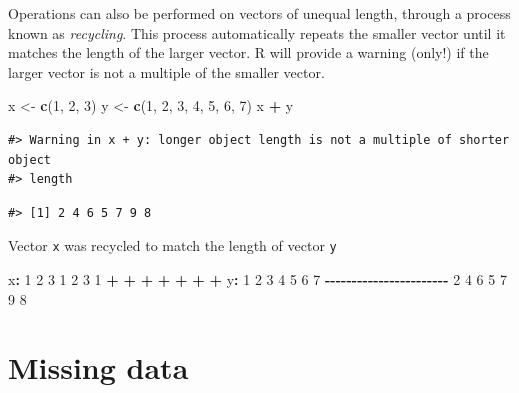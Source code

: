 \documentclass[
]{book}
\newenvironment{Shaded}{\begin{snugshade}}{\end{snugshade}}
\newcommand{\DecValTok}[1]{\textcolor[rgb]{0.00,0.00,0.81}{#1}}
\newcommand{\FunctionTok}[1]{\textcolor[rgb]{0.13,0.29,0.53}{\textbf{#1}}}
\newcommand{\NormalTok}[1]{#1}
\newcommand{\OtherTok}[1]{\textcolor[rgb]{0.56,0.35,0.01}{#1}}
\newcommand{\SpecialCharTok}[1]{\textcolor[rgb]{0.81,0.36,0.00}{\textbf{#1}}}
\begin{document}
Operations can also be performed on vectors of unequal length, through
a process known as \emph{recycling}. This process automatically repeats the smaller vector
until it matches the length of the larger vector. R will provide a warning
(only!) if the larger vector is not a multiple of the smaller vector.

\begin{Shaded}
\begin{Highlighting}[]
\NormalTok{x }\OtherTok{\textless{}{-}} \FunctionTok{c}\NormalTok{(}\DecValTok{1}\NormalTok{, }\DecValTok{2}\NormalTok{, }\DecValTok{3}\NormalTok{)}
\NormalTok{y }\OtherTok{\textless{}{-}} \FunctionTok{c}\NormalTok{(}\DecValTok{1}\NormalTok{, }\DecValTok{2}\NormalTok{, }\DecValTok{3}\NormalTok{, }\DecValTok{4}\NormalTok{, }\DecValTok{5}\NormalTok{, }\DecValTok{6}\NormalTok{, }\DecValTok{7}\NormalTok{)}
\NormalTok{x }\SpecialCharTok{+}\NormalTok{ y}
\end{Highlighting}
\end{Shaded}

\begin{verbatim}
#> Warning in x + y: longer object length is not a multiple of shorter object
#> length
\end{verbatim}

\begin{verbatim}
#> [1] 2 4 6 5 7 9 8
\end{verbatim}

Vector \texttt{x} was recycled to match the length of vector \texttt{y}

\begin{Shaded}
\begin{Highlighting}[]
\NormalTok{x}\SpecialCharTok{:}  \DecValTok{1}  \DecValTok{2}  \DecValTok{3}  \DecValTok{1}  \DecValTok{2}  \DecValTok{3}  \DecValTok{1}
    \SpecialCharTok{+}  \SpecialCharTok{+}  \SpecialCharTok{+}  \SpecialCharTok{+}  \SpecialCharTok{+}  \SpecialCharTok{+}  \SpecialCharTok{+}
\NormalTok{y}\SpecialCharTok{:}  \DecValTok{1}  \DecValTok{2}  \DecValTok{3}  \DecValTok{4}  \DecValTok{5}  \DecValTok{6}  \DecValTok{7}
\SpecialCharTok{{-}{-}{-}{-}{-}{-}{-}{-}{-}{-}{-}{-}{-}{-}{-}{-}{-}{-}{-}{-}{-}{-}{-}}
    \DecValTok{2}  \DecValTok{4}  \DecValTok{6}  \DecValTok{5}  \DecValTok{7}  \DecValTok{9}  \DecValTok{8}
\end{Highlighting}
\end{Shaded}

\section{Missing data}\label{missing-data}
\end{document}
